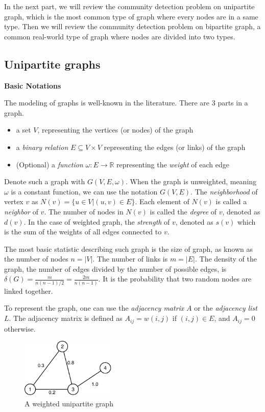 In the next part, we will review the community detection problem on unipartite graph,
which is the most common type of graph where every nodes are in a same type.
Then we will review the community detection problem on bipartite graph,
a common real-world type of graph where nodes are divided into two types.

\subsection{Unipartite graphs}

\textbf{Basic Notations}

The modeling of graphs is well-known in the literature.
There are 3 parts in a graph.

\begin{itemize}
	\item a set $V$, representing the vertices (or nodes) of the graph
	\item a \textit{binary relation} $E\subseteq V \times V$ representing the edges (or links) of the graph
	\item (Optional) a \textit{function} $\omega: E \rightarrow \mathbb{R}$ representing the \textit{weight} of each edge
\end{itemize}

Denote such a graph with $G(V, E, \omega)$.
When the graph is unweighted, meaning $\omega$ is a constant function, we can use the notation $G(V, E)$.
The \textit{neighborhood} of vertex $v$ as $N(v) = \{u \in V | (u, v) \in E\}$.
Each element of $N(v)$ is called a \textit{neighbor} of $v$.
The number of nodes in $N(v)$ is called the \textit{degree} of $v$, denoted as $d(v)$.
In the case of weighted graph, the \textit{strength} of $v$, denoted as $s(v)$
which is the sum of the weights of all edges connected to $v$.

The most basic statistic describing such graph is the size of graph, as known as the number of nodes $n = |V|$.
The number of links is $m = |E|$.
The density of the graph, the number of edges divided by the number of possible edges, is $\delta(G) = \frac{m}{n(n-1)/2} = \frac{2m}{n(n-1)}$.
It is the probability that two random nodes are linked together.

To represent the graph, one can use the \textit{adjacency matrix} $A$ or the \textit{adjacency list} $L$.
The adjacency matrix is defined as $A_{ij} = w(i, j)$ if $(i, j) \in E$, and $A_{ij} = 0$ otherwise.

\begin{figure}[H]
	\centering
	\includegraphics[width=0.4\textwidth]{images/weighted-unipartite.pdf}
	\caption{A weighted unipartite graph}
	\label{fig:weighted-unipartite-graph}
\end{figure}

